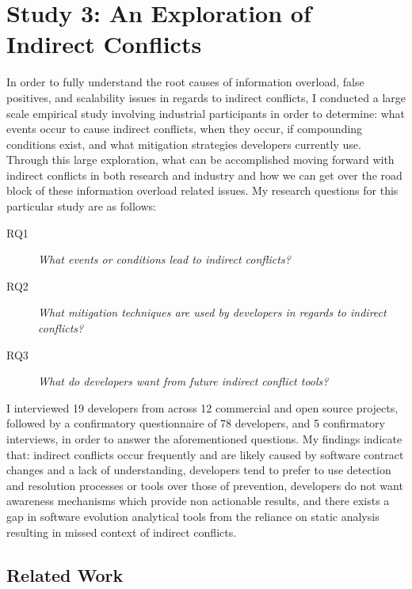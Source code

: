 \section{Study 3: An Exploration of Indirect Conflicts}
\label{study:exploration}

In order to fully understand the root causes of information overload, false positives, and
scalability issues in regards to indirect conflicts, I conducted a large scale empirical study involving industrial
participants in order to determine: what events occur to
cause indirect conflicts, when they occur, if compounding conditions exist, and what mitigation strategies developers currently
use. Through this large exploration, what can be accomplished moving forward with indirect conflicts
in both research and industry and how we can get over the road block of these information overload related
issues. My research questions for this particular study are as follows:

\begin{description}
        \item[RQ1] \textit{What events or conditions lead to indirect conflicts?}
        \item[RQ2] \textit{What mitigation techniques are used by developers in regards to indirect conflicts?}
        \item[RQ3] \textit{What do developers want from future indirect conflict tools?}
\end{description}

I interviewed 19 developers from across 12 commercial and open source projects, followed by a confirmatory questionnaire of 78 
developers, and 5 confirmatory interviews, in order to answer the aforementioned questions. My findings indicate that: 
indirect conflicts occur frequently and are likely caused by software contract changes and a lack of understanding,
developers tend to prefer to use detection and resolution processes or tools
over those of prevention, developers do not want awareness mechanisms which provide non actionable results, 
and there exists a gap in software evolution analytical tools from the reliance on static analysis resulting in missed
context of indirect conflicts.

\subsection{Related Work}
\label{sec:iced-related}

